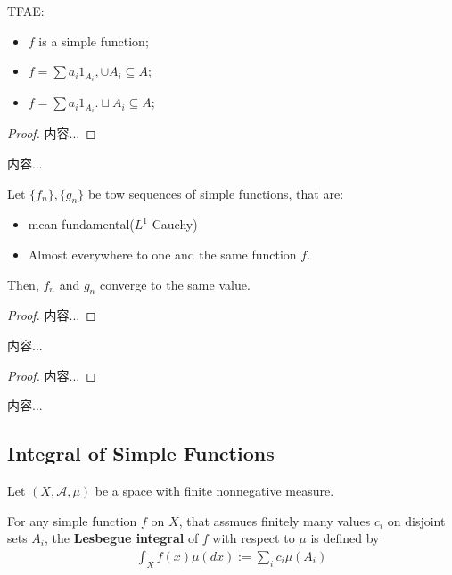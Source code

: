 \documentclass[Total.tex]{subfiles}
\begin{document}
			\begin{proposition}
				TFAE:
				\begin{itemize}
					\item $f$ is a simple function;
					\item $f=\sum a_i 1_{A_i},\cup A_i\subseteq A$;
					\item $f=\sum a_i 1_{A_i}.\sqcup A_i\subseteq A$;
				\end{itemize}
			\end{proposition}
			\begin{proof}
				内容...
			\end{proof}
			
			\begin{Def}
				内容...
			\end{Def}
			
			\begin{lemma}
				Let $\{f_n\},\{g_n\}$ be tow sequences of simple functions, that are:
				\begin{itemize}
					\item mean fundamental($L^1$ Cauchy)
					\item Almost everywhere to one and the same function $f$.
				\end{itemize}
				
				Then, $f_n$ and $g_n$ converge to the same value. 
			\end{lemma}
			\begin{proof}
				内容...
			\end{proof}
			
			\begin{lemma}
				内容...
			\end{lemma}
			\begin{proof}
				内容...
			\end{proof}
			
			\begin{Def}
				内容...
			\end{Def}
			
			\subsection{Integral of Simple Functions}
			
			\begin{Def}
				Let $(X,\mathcal{A},\mu)$ be a space with finite nonnegative measure. 
				
				For any simple function $f$ on $X$, that assmues finitely many values $c_i$ on disjoint sets $A_i$, the \textbf{Lesbegue integral} of $f$ with respect to $\mu$ is defined by
				\begin{gather*}
					\int_X f(x)\mu (dx):=\sum_i c_i\mu(A_i)
				\end{gather*}
			\end{Def}
			
\end{document}
